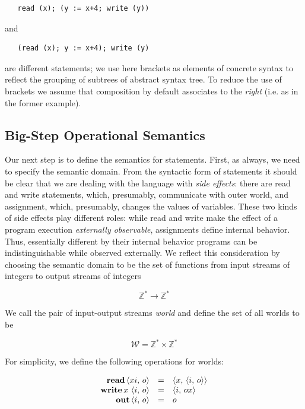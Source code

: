 \begin{lstlisting}
   read (x); (y := x+4; write (y))
\end{lstlisting}

and

\begin{lstlisting}
   (read (x); y := x+4); write (y)
\end{lstlisting}

are different statements; we use here brackets as elements of concrete syntax to reflect the grouping of subtrees of abstract syntax tree.
To reduce the use of brackets we assume that composition by default associates to the \emph{right} (i.e. as in the former example).

\subsection{Big-Step Operational Semantics}

Our next step is to define the semantics for statements. First, as always, we need to specify the semantic domain.
From the syntactic form of statements it should be clear that we are dealing with the language with \emph{side effects}: there are read and write statements,
which, presumably, communicate with outer world, and assignment, which, presumably, changes the values of variables. These two kinds of side effects
play different roles: while read and write make the effect of a program execution \emph{externally observable}, assignments define internal behavior.
Thus, essentially different by their internal behavior programs can be indistinguishable while observed externally. We reflect this consideration by
choosing the semantic domain to be the set of functions from input streams of integers to output streams of integers

\[
\mathbb{Z}^*\to\mathbb{Z}^*
\]

We call the pair of input-output streams \emph{world} and define the set of all worlds to be

\[
  \mathscr W = \mathbb Z^* \times \mathbb Z^*
\]

For simplicity, we define the following operations for worlds:

\[
\begin{array}{rcl}
  \mathbf{read}\,{\left<{xi,\,o}\right>}    & = & \left<{x,\,\left<{i,\,o}\right>}\right>\\
  \mathbf{write}\,{x\,\left<{i,\,o}\right>} & = & \left<{i,\,ox}\right>\\
  \mathbf{out}\,{\left<{i,\,o}\right>}      & = & o
\end{array}
\]


